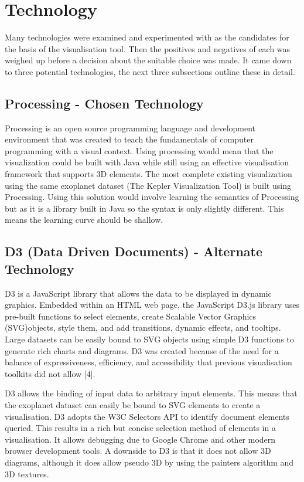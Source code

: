 \chapter{Technology} 

Many technologies were examined and experimented with as the candidates for the basis of the visualisation tool. Then the positives and
negatives of each was weighed up before a decision about the
suitable choice was made. It came down to three potential
technologies, the next three subsections outline these in
detail.

\section{Processing - Chosen Technology}
Processing \cite{processing} is an open source programming language and development environment
that was created to teach the fundamentals of computer programming with a visual
context.
Using processing would mean that the visualization could be built with Java
while still using
an effective visualisation framework that supports 3D elements. The most
complete existing visualization
using
the same exoplanet dataset (The Kepler Visualization Tool) is built using
Processing.
Using this solution would involve learning the semantics of Processing but as it
is a library built in Java so the syntax is only slightly different.
This means the learning
curve should be shallow.

\section{D3 (Data Driven Documents) - Alternate Technology}
D3 \cite{d3} is a JavaScript library that allows the data to be displayed in dynamic
graphics. Embedded
within an HTML web page, the JavaScript D3.js library uses pre-built
functions to
select elements, create Scalable Vector Graphics (SVG)objects, style them,
and add transitions,
dynamic effects, and tooltips. Large datasets can be easily bound to SVG objects
using
simple D3 functions to generate rich charts and diagrams. D3 was created because
of the
need for a balance of expressiveness, efficiency, and accessibility that
previous visualisation
toolkits did not allow [4].

D3 allows the binding of input data to arbitrary input elements. This means that
the exoplanet dataset can easily be bound to SVG elements to create a
visualisation. D3
adopts the W3C Selectors API to identify document elements queried. This results
in a
rich but concise selection method of elements in a visualisation. It allows
debugging due to Google Chrome and other modern browser
development tools. A downside to D3 is that it does not allow 3D diagrams,
although it does
allow pseudo 3D by using the painters algorithm and 3D textures.

